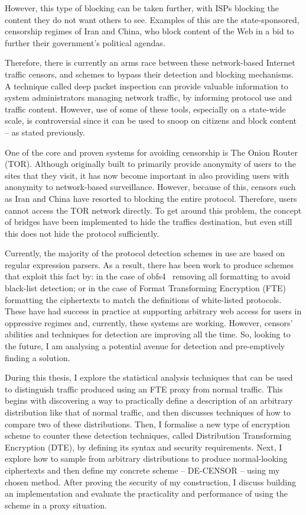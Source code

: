 \documentclass[ %
                    author={Samuel Russell},
                supervisor={Prof. Bogdan Warinschi},
                    degree={MEng},
                     title={Innocuous Ciphertexts},
                  subtitle={The DE-CENSOR Scheme},
                      type={Research},
                      year={2018} ]{dissertation}
\begin{document}
However, this type of blocking can be taken further, with ISPs blocking the content they do not want others to see. Examples of this are the state-sponsored, censorship regimes of Iran and China, who block content of the Web in a bid to further their government's political agendas.

Therefore, there is currently an arms race between these network-based Internet traffic censors, and schemes to bypass their detection and blocking mechanisms.
A technique called deep packet inspection can provide valuable information to system administrators managing network traffic, by informing protocol use and traffic content.
However, use of some of these tools, especially on a state-wide scale, is controversial since it can be used to snoop on citizens and block content -- as stated previously.

One of the core and proven systems for avoiding censorship is The Onion Router (TOR).
Although originally built to primarily provide anonymity of users to the sites that they visit, it has now become important in also providing users with anonymity to network-based surveillance.
However, because of this, censors such as Iran and China have resorted to blocking the entire protocol.
Therefore, users cannot access the TOR network directly.
To get around this problem, the concept of bridges have been implemented to hide the traffics destination, but even still this does not hide the protocol sufficiently.

Currently, the majority of the protocol detection schemes in use are based on regular expression parsers.
As a result, there has been work to produce schemes that exploit this fact by: in the case of obfs4~\cite{obfs4} removing all formatting to avoid black-list detection; or in the case of Format Transforming Encryption (FTE) formatting the ciphertexts to match the definitions of white-listed protocols.
These have had success in practice at supporting arbitrary web access for users in oppressive regimes and, currently, these systems are working.
However, censors' abilities and techniques for detection are improving all the time. So, looking to the future, I am analysing a potential avenue for detection and pre-emptively finding a solution.

During this thesis, I explore the statistical analysis techniques that can be used to distinguish traffic produced using an FTE proxy from normal traffic.
This begins with discovering a way to practically define a description of an arbitrary distribution like that of normal traffic, and then discusses techniques of how to compare two of these distributions.
Then, I formalise a new type of encryption scheme to counter these detection techniques, called Distribution Transforming Encryption (DTE), by defining its syntax and security requirements.
Next, I explore how to sample from arbitrary distributions to produce normal-looking ciphertexts and then define my concrete scheme -- DE-CENSOR -- using my chosen method.
After proving the security of my construction, I discuss building an implementation and evaluate the practicality and performance of using the scheme in a proxy situation.
\end{document}

